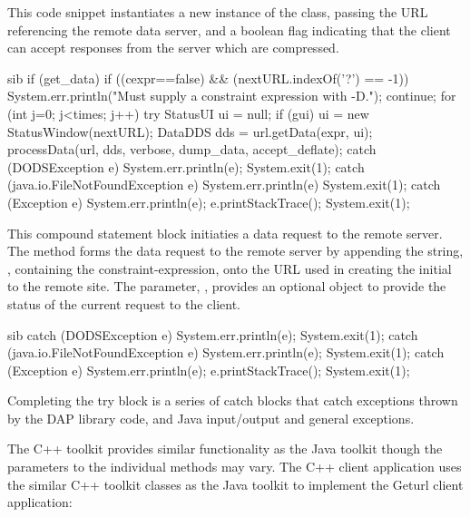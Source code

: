\documentclass{dods-paper}
\begin{document}
This code snippet instantiates a new instance of the 
class, passing the URL referencing the remote data server, and a
boolean flag indicating that the client can accept responses from the
server which are compressed.

\begin{vcode}{sib}
 if (get_data) {
    if ((cexpr==false) && (nextURL.indexOf('?') == -1)) {
        System.err.println("Must supply a constraint expression with -D.");
        continue;
    }
    for (int j=0; j<times; j++) {
        try {
           StatusUI ui = null;
           if (gui)
             ui = new StatusWindow(nextURL);
           DataDDS dds = url.getData(expr, ui);
           processData(url, dds, verbose, dump_data, accept_deflate);
        }
        catch (DODSException e) {
          System.err.println(e);
          System.exit(1);
        }
        catch (java.io.FileNotFoundException e) {
          System.err.println(e)
          System.exit(1);
        }
        catch (Exception e) {
          System.err.println(e);
          e.printStackTrace();
          System.exit(1);
        }
    }
 }
\end{vcode}  

This compound statement block initiaties a data request to the remote
server.  The  method  forms the data
request to the remote server by appending the string, ,
containing the constraint-expression, onto the URL used in creating
the initial  to the remote site.  The parameter,
, provides an optional  object to provide
the status of the current request to the client.

\begin{vcode}{sib} 
 catch (DODSException e) {
   System.err.println(e);
   System.exit(1);
 }
 catch (java.io.FileNotFoundException e) {
   System.err.println(e);
   System.exit(1);
 }
 catch (Exception e) {
   System.err.println(e);
   e.printStackTrace();
   System.exit(1);
 }
\end{vcode}
  
Completing the try block is a series of catch blocks that catch
exceptions thrown by the DAP library code, and Java input/output and
general exceptions.


The C++ toolkit provides similar functionality as the Java toolkit
though the parameters to the individual  methods may vary.
The C++ client application 
uses the similar C++ toolkit classes as the Java toolkit to implement the
Geturl client application:
\end{document}
